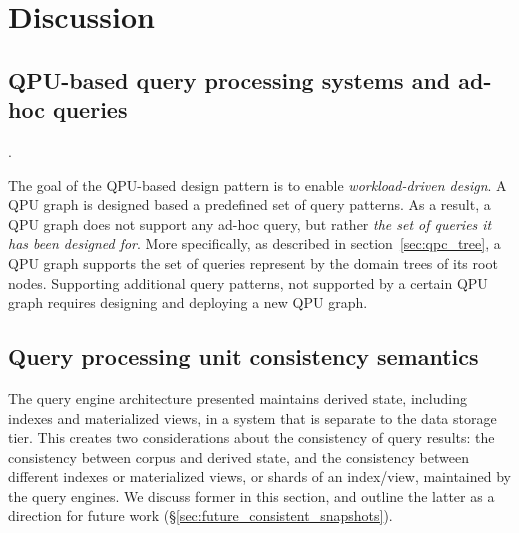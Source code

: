

\section{Discussion}

\subsection{QPU-based query processing systems and ad-hoc queries}.

The goal of the QPU-based design pattern is to enable \textit{workload-driven design}.
A QPU graph is designed based a predefined set of query patterns.
As a result, a QPU graph does not support any ad-hoc query,
but rather \textit{the set of queries it has been designed for}.
More specifically, as described in section~\ref{sec:qpc_tree}, a QPU graph supports the set of queries represent by the domain trees of its root nodes.
Supporting additional query patterns, not supported by a certain QPU graph requires designing and deploying a
new QPU graph.


\subsection{Query processing unit consistency semantics}

The query engine architecture presented maintains derived state, including indexes and materialized views,
in a system that is separate to the data storage tier.
This creates two considerations about the consistency of query results:
the consistency between corpus and derived state,
and the consistency between different indexes or materialized views, or shards of an index/view,
maintained by the query engines.
We discuss former in this section, and outline the latter as a direction for future work (\S\ref{sec:future_consistent_snapshots}).

